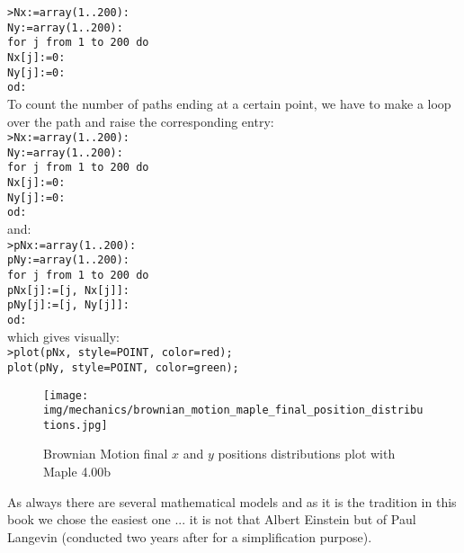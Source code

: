	\begin{tcolorbox}[colframe=black,colback=white,sharp corners]
	\texttt{>Nx:=array(1..200):\\
			Ny:=array(1..200):\\
			for j from 1 to 200 do\\
			   Nx[j]:=0:\\
			   Ny[j]:=0:\\
			od:}\\
			
	To count the number of paths ending at a certain point, we have to make a loop over the path and raise the corresponding entry:\\
	
	\texttt{>Nx:=array(1..200):\\
			Ny:=array(1..200):\\
			for j from 1 to 200 do\\
			   Nx[j]:=0:\\
			   Ny[j]:=0:\\
			od:}\\
	
	and:\\
	
	\texttt{>pNx:=array(1..200):\\
			pNy:=array(1..200):\\
			for j from 1 to 200 do\\
			   pNx[j]:=[j, Nx[j]]:\\
			   pNy[j]:=[j, Ny[j]]:\\
			od:}\\
			
	which gives visually:\\
	
	\texttt{>plot(pNx, style=POINT, color=red);\\
    		plot(pNy, style=POINT, color=green);}\\
	\begin{figure}[H]
		\centering
		\texttt{[image: img/mechanics/brownian\_motion\_maple\_final\_position\_distributions.jpg]}
		\caption[]{Brownian Motion final $x$ and $y$ positions distributions plot with Maple 4.00b}
	\end{figure}
	\end{tcolorbox}

	As always there are several mathematical models and as it is the tradition in this book we chose the easiest one ... it is not that Albert Einstein but of Paul Langevin (conducted two years after for a simplification purpose).

